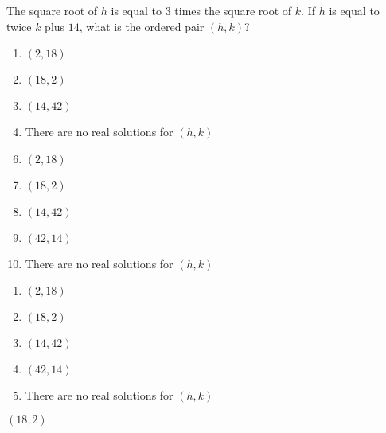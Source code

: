 The square root of $h$ is equal to $3$ times
the square root of $k$.  If $h$ is equal to
twice $k$ plus $14$, what is the ordered pair
$(h, k)$?



\ifsat
	\begin{enumerate}[label=\Alph*)]
		\item $(2,18)$
		\item $(18,2)$%
		\item $(14,42)$
		\item There are no real solutions for $(h,k)$
	\end{enumerate}
\else
\fi

\ifacteven
	\begin{enumerate}[label=\textbf{\Alph*.},itemsep=\fill,align=left]
		\setcounter{enumii}{5}
		\item $(2,18)$
		\item $(18,2)$%
		\item $(14,42)$
		\addtocounter{enumii}{1}
		\item $(42,14)$
		\item There are no real solutions for $(h,k)$
	\end{enumerate}
\else
\fi

\ifactodd
	\begin{enumerate}[label=\textbf{\Alph*.},itemsep=\fill,align=left]
		\item $(2,18)$
		\item $(18,2)$%
		\item $(14,42)$
		\item $(42,14)$
		\item There are no real solutions for $(h,k)$
	\end{enumerate}
\else
\fi

\ifgridin
 $(18,2)$%
		
\else
\fi

